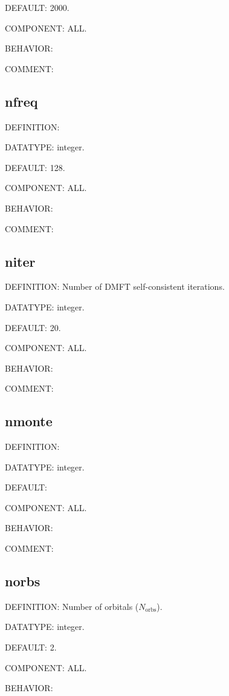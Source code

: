 {\color{blue}DEFAULT:} 2000.

{\color{brown}COMPONENT:} ALL.

{\color{purple}BEHAVIOR:}

{\color{olive}COMMENT:}

\subsection{nfreq}
{\color{red}DEFINITION:}

{\color{green}DATATYPE:} integer.

{\color{blue}DEFAULT:} 128.

{\color{brown}COMPONENT:} ALL.

{\color{purple}BEHAVIOR:}

{\color{olive}COMMENT:}

\subsection{niter}
{\color{red}DEFINITION:} Number of DMFT self-consistent iterations.

{\color{green}DATATYPE:} integer.

{\color{blue}DEFAULT:} 20.

{\color{brown}COMPONENT:} ALL.

{\color{purple}BEHAVIOR:}

{\color{olive}COMMENT:}

\subsection{nmonte}
{\color{red}DEFINITION:}

{\color{green}DATATYPE:} integer.

{\color{blue}DEFAULT:}

{\color{brown}COMPONENT:} ALL.

{\color{purple}BEHAVIOR:}

{\color{olive}COMMENT:}

\subsection{norbs}
{\color{red}DEFINITION:} Number of orbitals ($N_{\text{orbs}}$).

{\color{green}DATATYPE:} integer.

{\color{blue}DEFAULT:} 2.

{\color{brown}COMPONENT:} ALL.

{\color{purple}BEHAVIOR:}

